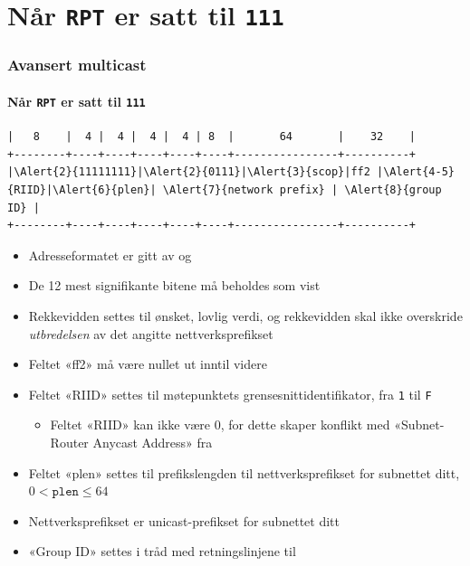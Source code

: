 \section{Når \texttt{RPT} er satt til \texttt{111}}
\begin{frame}[fragile]
  \frametitle{Avansert multicast}
  \framesubtitle{Når \texttt{RPT} er satt til \texttt{111}}
\begin{Verbatim}[commandchars=\\\{\},fontsize=\tiny]
|   8    |  4 |  4 |  4 |  4 | 8  |       64       |    32    |
+--------+----+----+----+----+----+----------------+----------+
|\Alert{2}{11111111}|\Alert{2}{0111}|\Alert{3}{scop}|ff2 |\Alert{4-5}{RIID}|\Alert{6}{plen}| \Alert{7}{network prefix} | \Alert{8}{group ID} |
+--------+----+----+----+----+----+----------------+----------+
\end{Verbatim}
  \begin{itemize}
  \item Adresseformatet er gitt av  og 
  \item \alert<2>{De 12 mest signifikante bitene} må beholdes som vist
  \item \alert<3>{Rekkevidden} settes til ønsket, lovlig verdi, og
    rekkevidden skal ikke overskride \textit{utbredelsen\/} av det
    angitte nettverksprefikset
  \item Feltet «ff2» må være nullet ut inntil videre
  \item Feltet «RIID» settes til \alert<4>{møtepunktets
      grensesnittidentifikator}, fra \texttt{1} til \texttt{F}
    \begin{itemize}
    \item Feltet \alert<5>{«RIID»} kan ikke være \(0\), for dette skaper
      konflikt med «Subnet-Router Anycast Address» fra 
    \end{itemize}
  \item Feltet «plen» settes til \alert<6>{prefikslengden til
      nettverksprefikset for subnettet ditt}, \(0<\mathtt{plen}\le64\)
  \item \alert<7>{Nettverksprefikset} er unicast-prefikset for
    subnettet ditt
  \item \alert<8>{«Group ID»} settes i tråd med retningslinjene til
  \end{itemize}
\end{frame}

